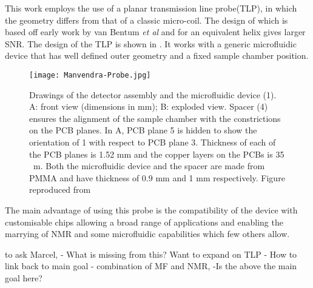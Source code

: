 This work employs the use of a planar transmission line probe(TLP)\citep{Finch:2016gv, RN164}, in which the geometry
differs from that of a classic micro-coil. The design of which is based off early work by van Bentum \textit{et
al} and for an equivalent helix gives  larger SNR\citep{vanBentum:2007fda}. The design of the TLP is shown in
. It works with a generic microfluidic device that has well defined outer geometry and a fixed sample
chamber position.
\begin{figure}
  \begin{center}
  \texttt{[image: Manvendra-Probe.jpg]}
  \end{center}
  \caption{Drawings of the detector assembly and the microfluidic device (1). A: front view (dimensions in mm); B:
  exploded view. Spacer (4) ensures the alignment of the sample chamber with the constrictions on the PCB planes. In A,
  PCB plane 5 is hidden to show the orientation of 1 with respect to PCB plane 3. Thickness of each of the PCB planes
  is 1.52 mm and the copper layers on the PCBs is 35 \mu~m. Both the microfluidic device and the spacer are made from
  PMMA and have thickness of 0.9 mm and 1 mm respectively. Figure reproduced from\citep{RN164}}
  \label{fig:MVProbe}
\end{figure}
The main advantage of using this probe is the compatibility of the device with customisable chips allowing
a broad range of applications and enabling the marrying of NMR and some microfluidic capabilities which
few others allow\citep{RN165,RN166,RN167}.

to ask Marcel,
- What is missing from this? Want to expand on TLP
- How to link back to main goal - combination of MF and NMR,
-Is the above the main goal here? 
